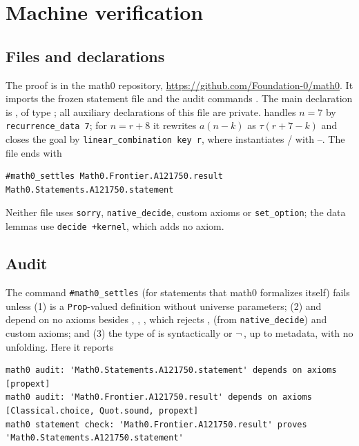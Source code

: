 \documentclass[11pt]{amsart}
\theoremstyle{plain}
\theoremstyle{definition}
\begin{document}
\section{Machine verification}\label{sec:lean}

\subsection*{Files and declarations}
The proof is  in the math0 repository, \url{https://github.com/Foundation-0/math0}. It imports the frozen statement file  and the audit commands . The main declaration is , of type ; all auxiliary declarations of this file are private.  handles $n=7$ by \texttt{recurrence\_data 7}; for $n=r+8$ it rewrites $a(n-k)$ as $\tau(r+7-k)$ and closes the goal by \texttt{linear\_combination key r}, where  instantiates / with --. The file ends with
\begin{lstlisting}
#math0_settles Math0.Frontier.A121750.result Math0.Statements.A121750.statement
\end{lstlisting}
Neither file uses \texttt{sorry}, \texttt{native\_decide}, custom axioms or \texttt{set\_option}; the data lemmas use \texttt{decide +kernel}, which adds no axiom.

\subsection*{Audit}
The command \texttt{\#math0\_settles} (for statements that math0 formalizes itself) fails unless (1)  is a \texttt{Prop}-valued definition without universe parameters; (2)  and  depend on no axioms besides , , , which rejects ,  (from \texttt{native\_decide}) and custom axioms; and (3) the type of  is syntactically  or $\neg$\,, up to metadata, with no unfolding. Here it reports
\begin{lstlisting}[language={},basicstyle=\ttfamily\scriptsize]
math0 audit: 'Math0.Statements.A121750.statement' depends on axioms [propext]
math0 audit: 'Math0.Frontier.A121750.result' depends on axioms [Classical.choice, Quot.sound, propext]
math0 statement check: 'Math0.Frontier.A121750.result' proves 'Math0.Statements.A121750.statement'
\end{lstlisting}
\end{document}
